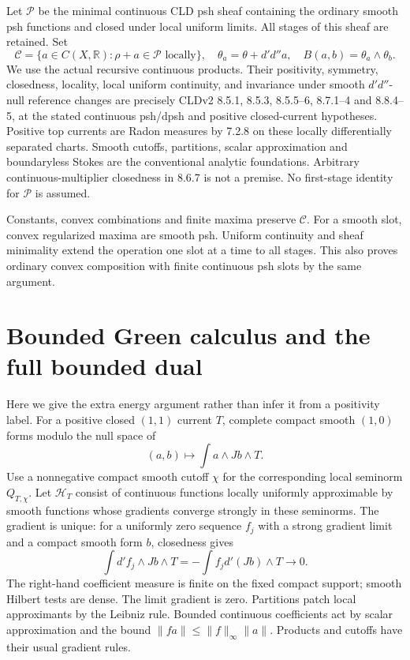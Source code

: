 \documentclass[11pt]{article}
\newcommand{\DD}{d'd''}
\newcommand{\C}{\mathcal C}
\newcommand{\RR}{\mathbb R}
\newcommand{\HH}{\mathscr H}
\theoremstyle{remark}\newtheorem{remark}[theorem]{Remark}
\begin{document}
Let $\mathscr P$ be the minimal continuous CLD psh sheaf containing
the ordinary smooth psh functions and closed under local uniform
limits. All stages of this sheaf are retained. Set
\[
 \C=\{a\in C(X,\RR):\rho+a\in\mathscr P\text{ locally}\},\quad
 \theta_a=\theta+\DD a,\quad B(a,b)=\theta_a\wedge\theta_b.
\]
We use the actual recursive continuous products. Their positivity,
symmetry, closedness, locality, local uniform continuity, and
invariance under smooth $\DD$-null reference changes are precisely
CLDv2 8.5.1, 8.5.3, 8.5.5--6, 8.7.1--4 and 8.8.4--5, at the stated
continuous psh/dpsh and positive closed-current hypotheses. Positive
top currents are Radon measures by 7.2.8 on these locally
differentially separated charts. Smooth cutoffs, partitions, scalar
approximation and boundaryless Stokes are the conventional analytic
foundations. Arbitrary continuous-multiplier closedness in 8.6.7 is
not a premise. No first-stage identity for $\mathscr P$ is assumed.

Constants, convex combinations and finite maxima preserve $\C$.
For a smooth slot, convex regularized maxima are smooth psh.
Uniform continuity and sheaf minimality extend the operation one
slot at a time to all stages. This also proves ordinary convex
composition with finite continuous psh slots by the same argument.

\section{Bounded Green calculus and the full bounded dual}
Here we give the extra energy argument rather than infer it from
a positivity label. For a positive closed $(1,1)$ current $T$,
complete compact smooth $(1,0)$ forms modulo the null space of
\[
 (a,b)\longmapsto\int a\wedge Jb\wedge T.
\]
Use a nonnegative compact smooth cutoff $\chi$ for the corresponding
local seminorm $Q_{T,\chi}$. Let $\HH_T$ consist of continuous
functions locally uniformly approximable by smooth functions whose
gradients converge strongly in these seminorms. The gradient is
unique: for a uniformly zero sequence $f_j$ with a strong gradient
limit and a compact smooth form $b$, closedness gives
\[
 \int d'f_j\wedge Jb\wedge T=-\int f_jd'(Jb)\wedge T\longrightarrow0.
\]
The right-hand coefficient measure is finite on the fixed compact
support; smooth Hilbert tests are dense. The limit gradient is zero.
Partitions patch local approximants by the Leibniz rule.
Bounded continuous coefficients act by scalar approximation and the
bound $\|fa\|\le\|f\|_\infty\|a\|$. Products and cutoffs have their
usual gradient rules.
\end{document}
